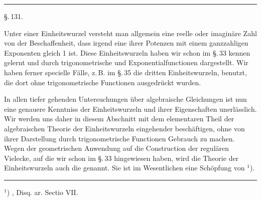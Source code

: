 
\begin{center}

\vspace{1em}

\vspace{0.5em}
\noindent\rule{4cm}{0.4pt}

\vspace{1em}
\S.\,131.

\vspace{0.5em}
\end{center}

\vspace{1em}
Unter einer Einheitswurzel versteht man allgemein eine
reelle oder imaginäre Zahl von der Beschaffenheit, dass irgend
eine ihrer Potenzen mit einem ganzzahligen Exponenten gleich
1 ist. Diese Einheitswurzeln haben wir schon im \S.\,33 kennen
gelernt und durch trigonometrische und Exponentialfunctionen
dargestellt. Wir haben ferner specielle Fälle, z.\,B. im \S.\,35 die
dritten Einheitswurzeln, benutzt, die dort ohne trigonometrische
Functionen ausgedrückt wurden.

In allen tiefer gehenden Untersuchungen über algebraische
Gleichungen ist nun eine genauere Kenntniss der Einheitswurzeln
und ihrer Eigenschaften unerlässlich. Wir werden uns daher in
diesem Abschnitt mit dem elementaren Theil der algebraischen
Theorie der Einheitswurzeln eingehender beschäftigen, ohne von
ihrer Darstellung durch trigonometrische Functionen Gebrauch
zu machen. Wegen der geometrischen Anwendung auf die Construction
der regulären Vielecke, auf die wir schon im \S.\,33
hingewiesen haben, wird die Theorie der Einheitswurzeln auch
die  genannt. Sie ist im Wesentlichen
eine Schöpfung von  $^1$).

\noindent\rule{4cm}{0.4pt}

$^1$) , Disq. ar. Sectio VII.
